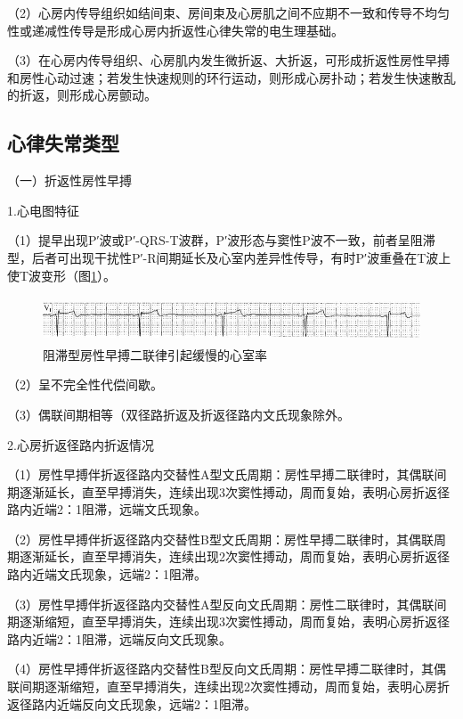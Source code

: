 （2）心房内传导组织如结间束、房间束及心房肌之间不应期不一致和传导不均匀性或递减性传导是形成心房内折返性心律失常的电生理基础。

（3）在心房内传导组织、心房肌内发生微折返、大折返，可形成折返性房性早搏和房性心动过速；若发生快速规则的环行运动，则形成心房扑动；若发生快速散乱的折返，则形成心房颤动。

\protect\hypertarget{text00021.htmlux5cux23subid236}{}{}

\subsection{心律失常类型}

（一）折返性房性早搏

1.心电图特征

（1）提早出现P′波或P′-QRS-T波群，P′波形态与窦性P波不一致，前者呈阻滞型，后者可出现干扰性P′-R间期延长及心室内差异性传导，有时P′波重叠在T波上使T波变形（图\ref{fig14-2}）。

\begin{figure}[!htbp]
 \centering
 \includegraphics[width=5.58333in,height=0.53125in]{./images/Image00246.jpg}
 \captionsetup{justification=centering}
 \caption{阻滞型房性早搏二联律引起缓慢的心室率}
 \label{fig14-2}
  \end{figure} 

（2）呈不完全性代偿间歇。

（3）偶联间期相等（双径路折返及折返径路内文氏现象除外。

2.心房折返径路内折返情况

（1）房性早搏伴折返径路内交替性A型文氏周期：房性早搏二联律时，其偶联间期逐渐延长，直至早搏消失，连续出现3次窦性搏动，周而复始，表明心房折返径路内近端2：1阻滞，远端文氏现象。

（2）房性早搏伴折返径路内交替性B型文氏周期：房性早搏二联律时，其偶联周期逐渐延长，直至早搏消失，连续出现2次窦性搏动，周而复始，表明心房折返径路内近端文氏现象，远端2：1阻滞。

（3）房性早搏伴折返径路内交替性A型反向文氏周期：房性二联律时，其偶联间期逐渐缩短，直至早搏消失，连续出现3次窦性搏动，周而复始，表明心房折返径路内近端2：1阻滞，远端反向文氏现象。

（4）房性早搏伴折返径路内交替性B型反向文氏周期：房性早搏二联律时，其偶联间期逐渐缩短，直至早搏消失，连续出现2次窦性搏动，周而复始，表明心房折返径路内近端反向文氏现象，远端2：1阻滞。

